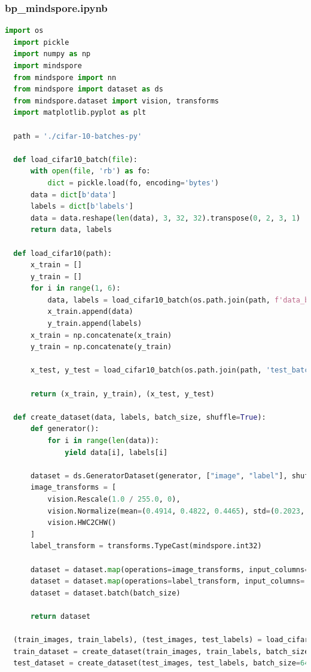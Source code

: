 \documentclass[12pt]{article}
\begin{document}
\subsubsection{bp\_mindspore.ipynb}
\begin{lstlisting}[language=Python]
  import os
  import pickle
  import numpy as np
  import mindspore
  from mindspore import nn
  from mindspore import dataset as ds
  from mindspore.dataset import vision, transforms
  import matplotlib.pyplot as plt
  
  path = './cifar-10-batches-py'
  
  def load_cifar10_batch(file):
      with open(file, 'rb') as fo:
          dict = pickle.load(fo, encoding='bytes')
      data = dict[b'data']
      labels = dict[b'labels']
      data = data.reshape(len(data), 3, 32, 32).transpose(0, 2, 3, 1)
      return data, labels
  
  def load_cifar10(path):
      x_train = []
      y_train = []
      for i in range(1, 6):
          data, labels = load_cifar10_batch(os.path.join(path, f'data_batch_{i}'))
          x_train.append(data)
          y_train.append(labels)
      x_train = np.concatenate(x_train)
      y_train = np.concatenate(y_train)
      
      x_test, y_test = load_cifar10_batch(os.path.join(path, 'test_batch'))
      
      return (x_train, y_train), (x_test, y_test)
  
  def create_dataset(data, labels, batch_size, shuffle=True):
      def generator():
          for i in range(len(data)):
              yield data[i], labels[i]
  
      dataset = ds.GeneratorDataset(generator, ["image", "label"], shuffle=shuffle)
      image_transforms = [
          vision.Rescale(1.0 / 255.0, 0),
          vision.Normalize(mean=(0.4914, 0.4822, 0.4465), std=(0.2023, 0.1994, 0.2010)),
          vision.HWC2CHW()
      ]
      label_transform = transforms.TypeCast(mindspore.int32)
      
      dataset = dataset.map(operations=image_transforms, input_columns='image')
      dataset = dataset.map(operations=label_transform, input_columns='label')
      dataset = dataset.batch(batch_size)
      
      return dataset
  
  (train_images, train_labels), (test_images, test_labels) = load_cifar10(path)
  train_dataset = create_dataset(train_images, train_labels, batch_size=64)
  test_dataset = create_dataset(test_images, test_labels, batch_size=64)
  

\end{lstlisting}
\end{document}
